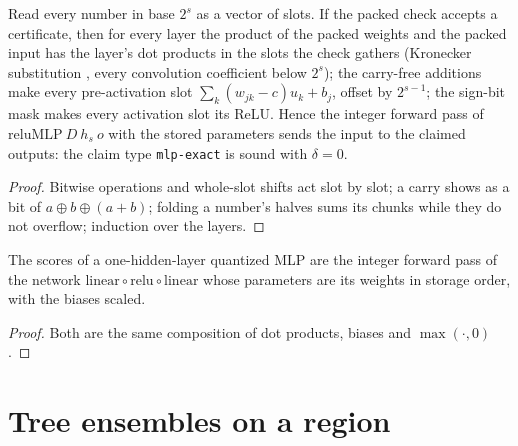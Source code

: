 \begin{theorem}\label{thm:mlp_exact}
\leanok
{}
Read every number in base $2^s$ as a vector of slots. If the packed check accepts a certificate, then
for every layer the product of the packed weights and the packed input has the layer's dot
products in the slots the check gathers (Kronecker substitution \cite{harvey2009kronecker}, every
convolution coefficient below $2^s$); the carry-free additions make every pre-activation slot
$\sum_k (w_{jk} - c) u_k + b_j$, offset by $2^{s-1}$; the sign-bit mask makes every activation slot its
ReLU. Hence the integer forward pass of $\mathrm{reluMLP}\ D\ h_s\ o$ with the stored parameters sends
the input to the claimed outputs: the claim type \texttt{mlp-exact} is sound with $\delta = 0$.
\end{theorem}
\begin{proof}
\leanok
Bitwise operations and whole-slot shifts act slot by slot; a carry shows as a bit of
$a \oplus b \oplus (a + b)$; folding a number's halves sums its chunks while they do not overflow;
induction over the layers.
\end{proof}

\begin{theorem}\label{thm:quantized_as_net}
\leanok
{}
The scores of a one-hidden-layer quantized MLP are the integer forward pass of the network
$\mathrm{linear} \circ \mathrm{relu} \circ \mathrm{linear}$ whose parameters are its weights in
storage order, with the biases scaled.
\end{theorem}
\begin{proof}
\leanok
Both are the same composition of dot products, biases and $\max(\cdot, 0)$.
\end{proof}

\chapter{Tree ensembles on a region}

